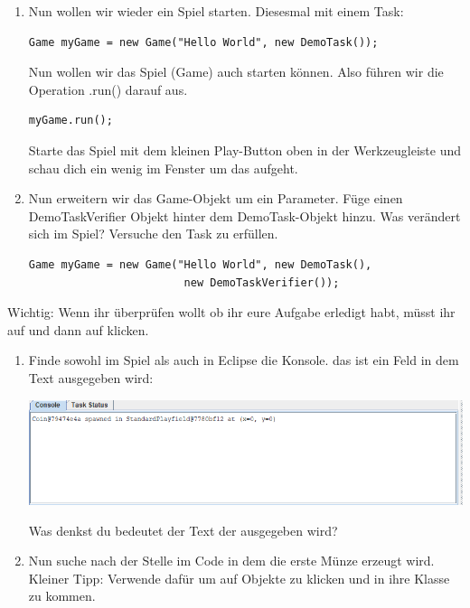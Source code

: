 

\begin{enumerate}
    \item Nun wollen wir wieder ein Spiel starten. Diesesmal mit einem Task:
    
    \begin{lstlisting}
Game myGame = new Game("Hello World", new DemoTask());
    \end{lstlisting}
    
    Nun wollen wir das Spiel (Game) auch starten können. Also führen wir die Operation .run() darauf aus. 
    
    \begin{lstlisting}
myGame.run();
    \end{lstlisting}
    
    Starte das Spiel mit dem kleinen Play-Button oben in der Werkzeugleiste und schau dich ein wenig im Fenster um das aufgeht.
    
    \item Nun erweitern wir das Game-Objekt um ein Parameter. Füge einen DemoTaskVerifier Objekt hinter dem DemoTask-Objekt hinzu. Was verändert sich im Spiel? Versuche den Task zu erfüllen.
    
    \begin{lstlisting}
Game myGame = new Game("Hello World", new DemoTask(), 
                        new DemoTaskVerifier());
    \end{lstlisting}
    
    \end{enumerate}
    \begin{Infobox}
    Wichtig: Wenn ihr überprüfen wollt ob ihr eure Aufgabe erledigt habt, müsst ihr auf  und dann auf  klicken.
    \end{Infobox}
    \begin{enumerate}
    
    \item Finde sowohl im Spiel als auch in Eclipse die Konsole. das ist ein Feld in dem Text ausgegeben wird:
    \begin{center}
        \includegraphics[width=\linewidth]{./figures/console.PNG}
    \end{center}
    
    Was denkst du bedeutet der Text der ausgegeben wird?
    
    \item Nun suche nach der Stelle im Code in dem die erste Münze erzeugt wird. Kleiner Tipp: Verwende dafür  um auf Objekte zu klicken und in ihre Klasse zu kommen.
\end{enumerate}
